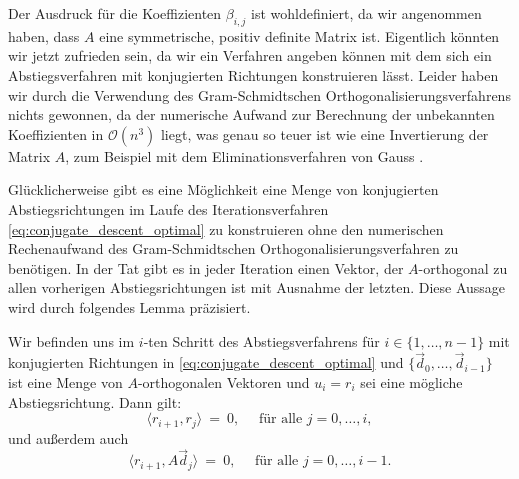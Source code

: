 Der Ausdruck für die Koeffizienten $\beta_{i,j}$ ist wohldefiniert, da wir angenommen haben, dass $A$ eine symmetrische, positiv definite Matrix ist.
Eigentlich könnten wir jetzt zufrieden sein, da wir ein Verfahren angeben können mit dem sich ein Abstiegsverfahren mit konjugierten Richtungen konstruieren lässt.
Leider haben wir durch die Verwendung des Gram-Schmidtschen Orthogonalisierungsverfahrens nichts gewonnen, da der numerische Aufwand zur Berechnung der unbekannten Koeffizienten in $\mathcal{O}(n^3)$ liegt, was genau so teuer ist wie eine Invertierung der Matrix $A$, zum Beispiel mit dem Eliminationsverfahren von Gauss \cite[Kapitel 2.1]{numerik1}.

Glücklicherweise gibt es eine Möglichkeit eine Menge von konjugierten Abstiegsrichtungen im Laufe des Iterationsverfahren \eqref{eq:conjugate_descent_optimal} zu konstruieren ohne den numerischen Rechenaufwand des Gram-Schmidtschen Orthogonalisierungsverfahren zu benötigen.
In der Tat gibt es in jeder Iteration einen Vektor, der $A$-orthogonal zu allen vorherigen Abstiegsrichtungen ist mit Ausnahme der letzten.
Diese Aussage wird durch folgendes Lemma präzisiert.
\begin{lemma}{}{}
\label{lem:residual_direction}
Wir befinden uns im $i$-ten Schritt des Abstiegsverfahrens für $i \in \lbrace 1,\ldots,n-1 \rbrace$ mit konjugierten Richtungen in \eqref{eq:conjugate_descent_optimal} und $\lbrace \vec{d}_0, \ldots, \vec{d}_{i-1} \rbrace$ ist eine Menge von $A$-orthogonalen Vektoren und $u_i = r_i$ sei eine mögliche Abstiegsrichtung. Dann gilt:
\begin{equation*}
\langle r_{i+1}, r_j \rangle \ = \ 0, \quad \text{ für alle } j=0,\ldots,i,
\end{equation*}
und außerdem auch
\begin{equation*}
\langle r_{i+1}, A\vec{d}_j \rangle \ = \ 0, \quad \text{ für alle } j=0,\ldots,i-1.
\end{equation*}
\end{lemma}
